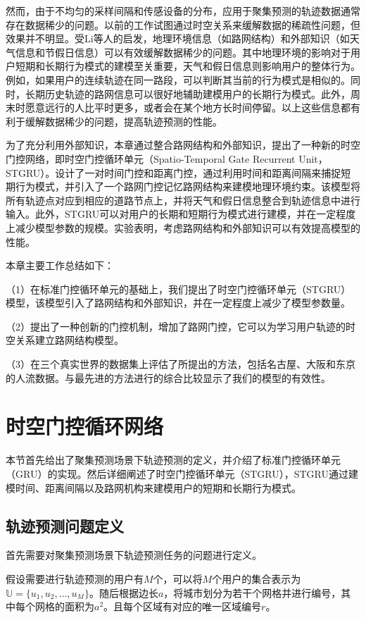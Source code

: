 \documentclass[master]{thesis-uestc}
\begin{document}
然而，由于不均匀的采样间隔和传感设备的分布，应用于聚集预测的轨迹数据通常存在数据稀少的问题。以前的工作试图通过时空关系来缓解数据的稀疏性问题，但效果并不明显。受Li等人的启发，地理环境信息（如路网结构）和外部知识（如天气信息和节假日信息）可以有效缓解数据稀少的问题。其中地理环境的影响对于用户短期和长期行为模式的建模至关重要，天气和假日信息则影响用户的整体行为。例如，如果用户的连续轨迹在同一路段，可以判断其当前的行为模式是相似的。同时，长期历史轨迹的路网信息可以很好地辅助建模用户的长期行为模式。此外，周末时愿意远行的人比平时更多，或者会在某个地方长时间停留。以上这些信息都有利于缓解数据稀少的问题，提高轨迹预测的性能。

为了充分利用外部知识，本章通过整合路网结构和外部知识，提出了一种新的时空门控网络，即时空门控循环单元（Spatio-Temporal Gate Recurrent Unit，STGRU）。设计了一对时间门控和距离门控，通过利用时间和距离间隔来捕捉短期行为模式，并引入了一个路网门控记忆路网结构来建模地理环境约束。该模型将所有轨迹点对应到相应的道路节点上，并将天气和假日信息整合到轨迹信息中进行输入。此外，STGRU可以对用户的长期和短期行为模式进行建模，并在一定程度上减少模型参数的规模。实验表明，考虑路网结构和外部知识可以有效提高模型的性能。

本章主要工作总结如下：

（1）在标准门控循环单元的基础上，我们提出了时空门控循环单元（STGRU）模型，该模型引入了路网结构和外部知识，并在一定程度上减少了模型参数量。

（2）提出了一种创新的门控机制，增加了路网门控，它可以为学习用户轨迹的时空关系建立路网结构模型。

（3）在三个真实世界的数据集上评估了所提出的方法，包括名古屋、大阪和东京的人流数据。与最先进的方法进行的综合比较显示了我们的模型的有效性。

\section{时空门控循环网络}
本节首先给出了聚集预测场景下轨迹预测的定义，并介绍了标准门控循环单元（GRU）的实现。然后详细阐述了时空门控循环单元（STGRU），STGRU通过建模时间、距离间隔以及路网机构来建模用户的短期和长期行为模式。

\subsection{轨迹预测问题定义}

首先需要对聚集预测场景下轨迹预测任务的问题进行定义。

假设需要进行轨迹预测的用户有$M$个，可以将$M$个用户的集合表示为$\mathbb{U}= \{u_1,u_2,\dots, u_M\}$。随后根据边长$a$，将城市划分为若干个网格并进行编号，其中每个网格的面积为$a^2$。且每个区域有对应的唯一区域编号$r$。
\end{document}
